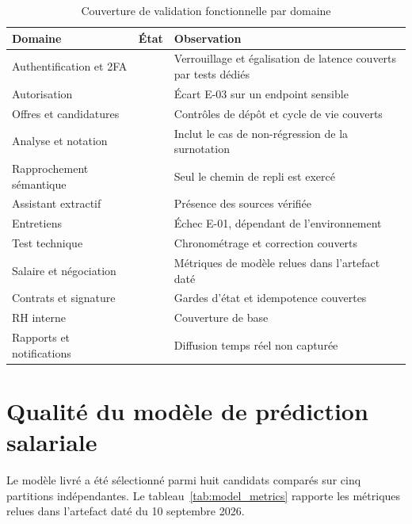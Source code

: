 \begin{table}[htbp]
  \centering
  \caption{Couverture de validation fonctionnelle par domaine}
  \label{tab:functional_validation}
  \begin{tabularx}{\textwidth}{L{3.4cm} L{3.2cm} X}
    \toprule
    \textbf{Domaine} & \textbf{État} & \textbf{Observation} \\
    \midrule
    Authentification et 2FA &  & Verrouillage et égalisation de latence couverts par tests dédiés \\
    Autorisation            &      & Écart E-03 sur un endpoint sensible \\
    Offres et candidatures  &  & Contrôles de dépôt et cycle de vie couverts \\
    Analyse et notation     &  & Inclut le cas de non-régression de la surnotation \\
    Rapprochement sémantique&          & Seul le chemin de repli est exercé \\
    Assistant extractif     &  & Présence des sources vérifiée \\
    Entretiens              &      & Échec E-01, dépendant de l'environnement \\
    Test technique          &  & Chronométrage et correction couverts \\
    Salaire et négociation  &  & Métriques de modèle relues dans l'artefact daté \\
    Contrats et signature   &  & Gardes d'état et idempotence couvertes \\
    RH interne              &  & Couverture de base \\
    Rapports et notifications&  & Diffusion temps réel non capturée \\
    \bottomrule
  \end{tabularx}
\end{table}

\section{Qualité du modèle de prédiction salariale}
\label{sec:model_quality}

Le modèle livré a été sélectionné parmi huit candidats comparés sur cinq
partitions indépendantes. Le tableau~\ref{tab:model_metrics} rapporte les
métriques relues dans l'artefact daté du 10 septembre 2026.


